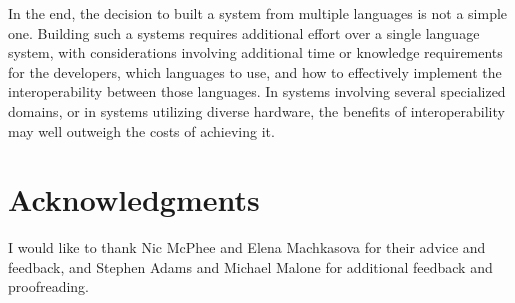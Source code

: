 \documentclass{sig-alternate}
\begin{document}
In the end, the decision to built a system from multiple languages is not a simple one. Building such a systems requires additional effort over a single language system, with considerations involving additional time or knowledge requirements for the developers, which languages to use, and how to effectively implement the interoperability between those languages. In systems involving several specialized domains, or in systems utilizing diverse hardware, the benefits of interoperability may well outweigh the costs of achieving it.




\section{Acknowledgments}
I would like to thank Nic McPhee and Elena Machkasova for their advice and feedback, and Stephen Adams and Michael Malone for additional feedback and proofreading.



  
\end{document}
